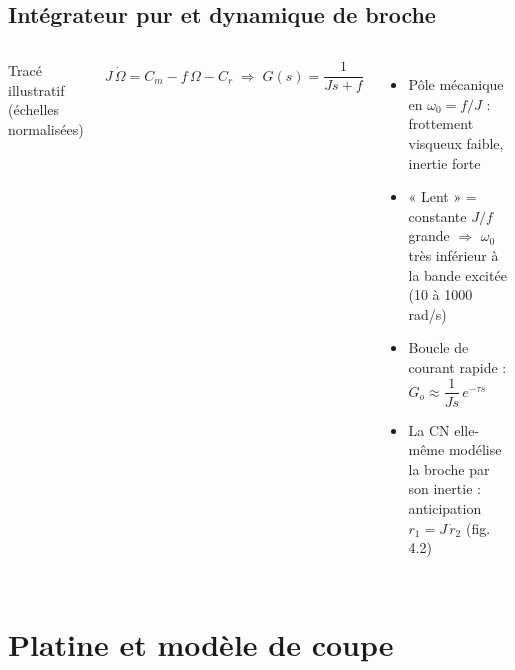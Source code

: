 \subsection*{Intégrateur pur et dynamique de broche}
\begin{frame}

    \begin{columns}[c]
        \centering
        
        {\scriptsize\color{jvgris} Tracé illustratif (échelles normalisées)}

        \[
            J\,\dot{\Omega} = C_m - f\,\Omega - C_r
            \;\Rightarrow\;
            G(s) = \frac{1}{Js + f}
        \]
        \begin{itemize}
            \item Pôle mécanique en $\omega_0 = f/J$ : frottement visqueux faible, inertie forte
            \item « Lent » = constante $J/f$ \alert{grande} $\Rightarrow$ $\omega_0$ très inférieur à la bande excitée (10 à 1000\,rad/s)
            \item Boucle de courant rapide : $G_o \approx \dfrac{1}{Js}\,e^{-\tau s}$
            \item La CN elle-même modélise la broche par son inertie : anticipation $r_1 = J\,\dot{r}_2$ (fig. 4.2)
        \end{itemize}
    \end{columns}
\end{frame}

\section{Platine et modèle de coupe}

